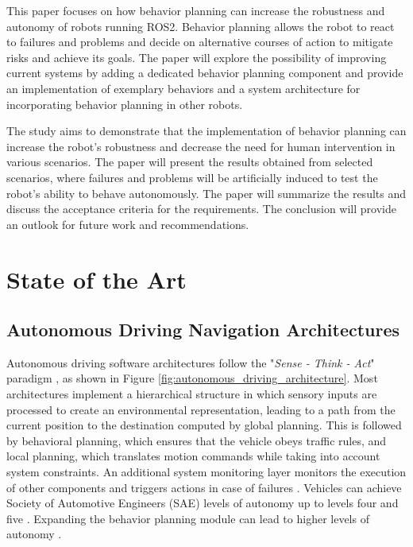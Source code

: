 \documentclass[letterpaper, 10pt, conference]{ieeeconf}
\begin{document}
This paper focuses on how behavior planning can increase the robustness and autonomy of robots running ROS2. Behavior planning allows the robot to react to failures and problems and decide on alternative courses of action to mitigate risks and achieve its goals. The paper will explore the possibility of improving current systems by adding a dedicated behavior planning component and provide an implementation of exemplary behaviors and a system architecture for incorporating behavior planning in other robots.

The study aims to demonstrate that the implementation of behavior planning can increase the robot's robustness and decrease the need for human intervention in various scenarios. The paper will present the results obtained from selected scenarios, where failures and problems will be artificially induced to test the robot's ability to behave autonomously. The paper will summarize the results and discuss the acceptance criteria for the requirements. The conclusion will provide an outlook for future work and recommendations.


\section{State of the Art}
\label{sec:StateOfTheArt}

\subsection{Autonomous Driving Navigation Architectures}

Autonomous driving software architectures follow the "\textit{Sense - Think - Act}" paradigm \cite{murphy2000}, as shown in Figure \ref{fig:autonomous_driving_architecture}. Most architectures implement a hierarchical structure in which sensory inputs are processed to create an environmental representation, leading to a path from the current position to the destination computed by global planning. This is followed by behavioral planning, which ensures that the vehicle obeys traffic rules, and local planning, which translates motion commands while taking into account system constraints. An additional system monitoring layer monitors the execution of other components and triggers actions in case of failures \cite{zimmermann2020adaptive}. Vehicles can achieve Society of Automotive Engineers (SAE) levels of autonomy up to levels four and five \cite{bacha2008odin}. Expanding the behavior planning module can lead to higher levels of autonomy \cite{reke2020}.
\end{document}
